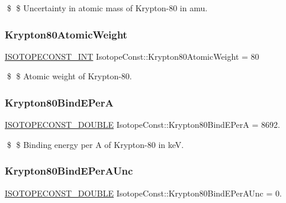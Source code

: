 \$ \$ Uncertainty in atomic mass of Krypton-\/80 in amu. \mbox{\label{group___isotope_const-_krypton-_kr80_ga0c8d829fdd17752de7139b04172f42c3}} 
\subsubsection{\texorpdfstring{Krypton80\+Atomic\+Weight}{Krypton80AtomicWeight}}
{\footnotesize\ttfamily \mbox{\hyperlink{group___isotope_const-_macros_ga5f18360b3e99483a35c32d789e62621c}{I\+S\+O\+T\+O\+P\+E\+C\+O\+N\+S\+T\+\_\+\+I\+NT}} Isotope\+Const\+::\+Krypton80\+Atomic\+Weight = 80}

\$ \$ Atomic weight of Krypton-\/80. \mbox{\label{group___isotope_const-_krypton-_kr80_gace7628ed246e3295c91b3daebafbd9e5}} 
\subsubsection{\texorpdfstring{Krypton80\+Bind\+E\+PerA}{Krypton80BindEPerA}}
{\footnotesize\ttfamily \mbox{\hyperlink{group___isotope_const-_macros_ga8f45a7272ce02c0b4c65c44636ed719a}{I\+S\+O\+T\+O\+P\+E\+C\+O\+N\+S\+T\+\_\+\+D\+O\+U\+B\+LE}} Isotope\+Const\+::\+Krypton80\+Bind\+E\+PerA = 8692.}

\$ \$ Binding energy per A of Krypton-\/80 in keV. \mbox{\label{group___isotope_const-_krypton-_kr80_ga4daa98720126f52fbbf8edf67ccccd46}} 
\subsubsection{\texorpdfstring{Krypton80\+Bind\+E\+Per\+A\+Unc}{Krypton80BindEPerAUnc}}
{\footnotesize\ttfamily \mbox{\hyperlink{group___isotope_const-_macros_ga8f45a7272ce02c0b4c65c44636ed719a}{I\+S\+O\+T\+O\+P\+E\+C\+O\+N\+S\+T\+\_\+\+D\+O\+U\+B\+LE}} Isotope\+Const\+::\+Krypton80\+Bind\+E\+Per\+A\+Unc = 0.}

